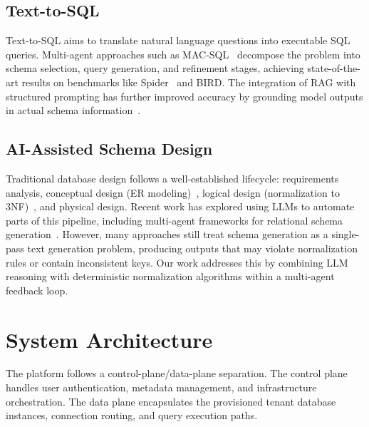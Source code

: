 \documentclass[twoside,twocolumn,10pt]{article}
\begin{document}
\subsection{Text-to-SQL}

Text-to-SQL aims to translate natural language questions into executable SQL queries. Multi-agent approaches such as MAC-SQL~\cite{Multi_Agent_Text_to_SQL} decompose the problem into schema selection, query generation, and refinement stages, achieving state-of-the-art results on benchmarks like Spider~\cite{yu2018spider} and BIRD. The integration of RAG with structured prompting has further improved accuracy by grounding model outputs in actual schema information~\cite{Text_to_SQL_Survey, Optimizing_text_to_SQL}.

\subsection{AI-Assisted Schema Design}

Traditional database design follows a well-established lifecycle: requirements analysis, conceptual design (ER modeling)~\cite{chen1976}, logical design (normalization to 3NF)~\cite{bernstein1976}, and physical design. Recent work has explored using LLMs to automate parts of this pipeline, including multi-agent frameworks for relational schema generation~\cite{schemaagent2025}. However, many approaches still treat schema generation as a single-pass text generation problem, producing outputs that may violate normalization rules or contain inconsistent keys. Our work addresses this by combining LLM reasoning with deterministic normalization algorithms within a multi-agent feedback loop.


\section{System Architecture}
\fontsize{11}{13}\selectfont

The platform follows a control-plane/data-plane separation. The control plane handles user authentication, metadata management, and infrastructure orchestration. The data plane encapsulates the provisioned tenant database instances, connection routing, and query execution paths.

\end{document}
